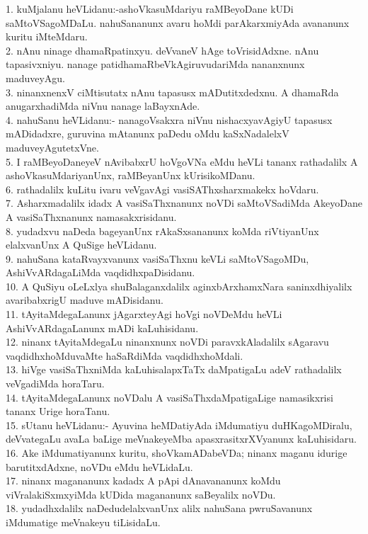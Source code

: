 \documentclass{article}
\begin{document}
1. kuMjalanu heVLidanu:-ashoVkasuMdariyu raMBeyoDane kUDi saMtoVSagoMDaLu. nahuSananunx avaru hoMdi parAkarxmiyAda avananunx kuritu iMteMdaru.\\
2. nAnu ninage dhamaRpatinxyu. deVvaneV hAge toVrisidAdxne. nAnu tapasivxniyu. nanage patidhamaRbeVkAgiruvudariMda nananxnunx maduveyAgu.\\
3. ninanxnenxV ciMtisutatx nAnu tapasusx mADutitxdedxnu. A dhamaRda anugarxhadiMda niVnu nanage laBayxnAde.\\
4. nahuSanu heVLidanu:- nanagoVsakxra niVnu nishacxyavAgiyU tapasusx mADidadxre, guruvina mAtanunx paDedu oMdu kaSxNadalelxV maduveyAgutetxVne.\\
5. I raMBeyoDaneyeV nAvibabxrU hoVgoVNa eMdu heVLi tananx rathadalilx A ashoVkasuMdariyanUnx, raMBeyanUnx kUrisikoMDanu.\\
6. rathadalilx kuLitu ivaru veVgavAgi vasiSAThxsharxmakekx hoVdaru.\\
7. Asharxmadalilx idadx A vasiSaThxnanunx noVDi saMtoVSadiMda AkeyoDane A vasiSaThxnanunx namasakxrisidanu.\\
8. yudadxvu naDeda bageyanUnx rAkaSxsananunx koMda riVtiyanUnx elalxvanUnx A QuSige heVLidanu.\\
9. nahuSana kataRvayxvanunx vasiSaThxnu keVLi saMtoVSagoMDu, AshiVvARdagaLiMda vaqdidhxpaDisidanu.\\
10. A QuSiyu oLeLxlya shuBalaganxdalilx aginxbArxhamxNara saninxdhiyalilx avaribabxrigU maduve mADisidanu.\\
11. tAyitaMdegaLanunx jAgarxteyAgi hoVgi noVDeMdu heVLi AshiVvARdagaLanunx mADi kaLuhisidanu.\\
12. ninanx tAyitaMdegaLu ninanxnunx noVDi paravxkAladalilx sAgaravu vaqdidhxhoMduvaMte haSaRdiMda vaqdidhxhoMdali.\\
13. hiVge vasiSaThxniMda kaLuhisalapxTaTx daMpatigaLu adeV rathadalilx veVgadiMda horaTaru.\\
14. tAyitaMdegaLanunx noVDalu A vasiSaThxdaMpatigaLige namasikxrisi tananx Urige horaTanu.\\
15. sUtanu heVLidanu:- Ayuvina heMDatiyAda iMdumatiyu duHKagoMDiralu, deVvategaLu avaLa baLige meVnakeyeMba apasxrasitxrXVyanunx kaLuhisidaru.\\
16. Ake iMdumatiyanunx kuritu, shoVkamADabeVDa; ninanx maganu idurige barutitxdAdxne, noVDu eMdu heVLidaLu.\\
17. ninanx magananunx kadadx A pApi dAnavananunx koMdu viVralakiSxmxyiMda kUDida magananunx saBeyalilx noVDu.\\
18. yudadhxdalilx naDedudelalxvanUnx alilx nahuSana pwruSavanunx iMdumatige meVnakeyu tiLisidaLu.\\
\end{document}
